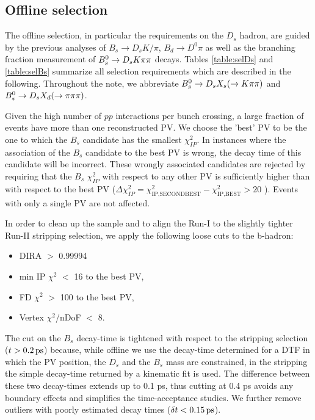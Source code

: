 \subsection{Offline selection}

The offline selection, in particular the requirements on the $D_s$ hadron, are guided by the previous analyses of 
$B_s \to D_s K/\pi$, $B_d \to D^0 \pi$ as well as the branching fraction measurement of ${{B}^0_{s}}\rightarrow{\ensuremath{{D}_{s}}}{\ensuremath{K}}{\ensuremath{\pi}}{\ensuremath{\pi}}$ decays.
Tables \ref{table:selDs} and \ref{table:selBs} summarize all selection requirements which are described in the following.
Throughout the note, we abbreviate ${{B}^0_{s}}\rightarrow{\ensuremath{{D}_{s}}} X_{s}(\rightarrow{\ensuremath{K}}{\ensuremath{\pi}}{\ensuremath{\pi}})$ and ${{B}^0_{s}}\rightarrow{\ensuremath{{D}_{s}}} X_{d}(\rightarrow{\ensuremath{\pi}}{\ensuremath{\pi}}{\ensuremath{\pi}})$.

Given the high number of $pp$ interactions per bunch crossing, a large fraction
of events have more than one reconstructed PV. 
We choose the 'best' PV to be the one to which the 
$B_s$ candidate has the smallest $\chi^2_{IP}$.
In instances where the association of the $B_s$ candidate to the best PV is wrong,
the decay time of this candidate will be incorrect. 
These wrongly associated candidates
are rejected by requiring that the $B_s$ $\chi^2_{IP}$ with respect to any other PV is sufficiently higher than with respect to the best PV 
($\Delta \chi^2_{IP} = \chi^2_{\text{IP,SECONDBEST}} - \chi^2_{\text{IP,BEST}} > 20$ ).
Events with only a single PV are not affected.

In order to clean up the sample and to align the Run-I to the slightly tighter Run-II stripping selection, we apply the following loose cuts to the b-hadron:
\begin{itemize}
\item DIRA $>$ 0.99994
\item min IP $\chi^{2}$ $<$ 16 to the best PV,
\item FD $\chi^{2}$ $>$ 100 to the best PV,
\item Vertex $\chi^{2}$/nDoF $<$ 8.
\end{itemize}    
The cut on the $B_s$ decay-time is tightened with respect to the stripping selection ($t > 0.2 {\mathrm{ \,ps}}$) because, while offline we use the decay-time determined for a DTF in which the PV position, the $D_s$ and the $B_s$ mass are constrained, in the stripping the simple decay-time returned by a kinematic fit is used. 
The difference between these two decay-times extends up to 0.1 ps, thus cutting at 0.4 ps avoids any boundary effects and simplifies the time-acceptance studies.
We further remove outliers with poorly estimated decay times ($\delta t< 0.15 {\mathrm{ \,ps}}$).

